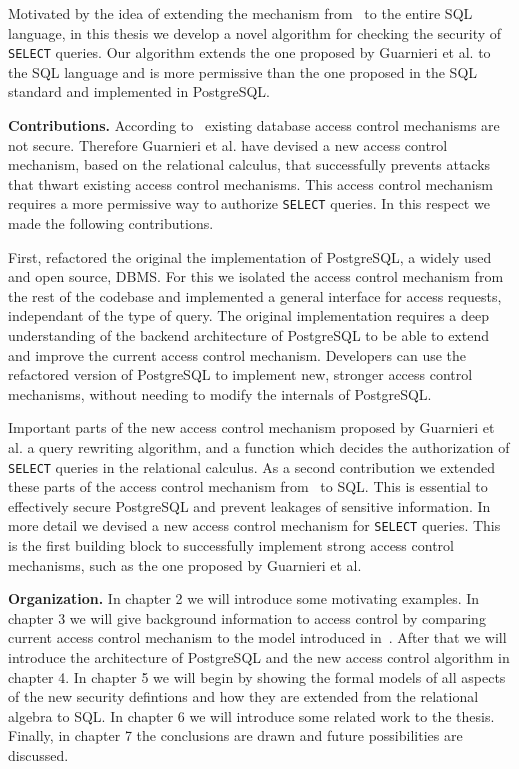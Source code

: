 Motivated by the idea of extending the mechanism from~\cite{guarnieri2016strong} to the entire SQL language, in this thesis we develop a novel algorithm for checking the security of \texttt{SELECT} queries.
%
Our algorithm extends the one proposed by Guarnieri et al. to the SQL language and is more permissive than the one proposed in the SQL standard and  implemented in PostgreSQL.
\newline

\smallskip
\noindent
{\bf Contributions.}
According to~\cite{guarnieri2016strong} existing database access control mechanisms are not secure. 
%
Therefore Guarnieri et al. have devised a new access control mechanism, based on the relational calculus, that successfully prevents attacks that thwart existing access control mechanisms.
%
This access control mechanism requires a more permissive way to authorize \texttt{SELECT} queries.
%
In this respect we made the following contributions.

First, refactored the original the implementation of PostgreSQL, a widely used and open source, DBMS.
%
For this we isolated the access control mechanism from the rest of the codebase and implemented a general interface for access requests, independant of the type of query.
%
The original implementation requires a deep understanding of the backend architecture of PostgreSQL to be able to extend and improve the current access control mechanism.
%
Developers can use the refactored version of PostgreSQL to implement new, stronger access control mechanisms, without needing to modify the internals of PostgreSQL.

Important parts of the new access control mechanism proposed by Guarnieri et al. a query rewriting algorithm, and a function which decides the authorization of \texttt{SELECT} queries in the relational calculus.
%
As a second contribution we extended these parts of the access control mechanism from~\cite{guarnieri2016strong} to SQL.
%
This is essential to effectively secure PostgreSQL and prevent leakages of sensitive information. 
%
In more detail we devised a new access control mechanism for \texttt{SELECT} queries.
%
This is the first building block to successfully implement strong access control mechanisms, such as the one proposed by Guarnieri et al.

\smallskip
\noindent
{\bf Organization.}
%
In chapter 2 we will introduce some motivating examples.
%
In chapter 3 we will give background information to access control by comparing current access control mechanism to the model introduced in~\cite{guarnieri2016strong}.
%
After that we will introduce the architecture of PostgreSQL and the new access control algorithm in chapter 4. 
%
In chapter 5 we will begin by showing the formal models of all aspects of the new security defintions and how they are extended from the relational algebra to SQL.  
%
In chapter 6 we will introduce some related work to the thesis. 
%
Finally, in chapter 7 the conclusions are drawn and future possibilities are discussed.